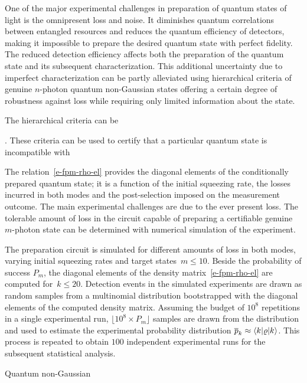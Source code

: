 \documentclass{article}
\begin{document}
One of the major experimental challenges in preparation of quantum states of light is the omnipresent loss and noise. It diminishes quantum correlations between entangled resources and reduces the quantum efficiency of detectors, making it impossible to prepare the desired quantum state with perfect fidelity. The reduced detection efficiency affects both the preparation of the quantum state and its subsequent characterization. This additional uncertainty due to imperfect characterization can be partly alleviated using hierarchical criteria of genuine $n$-photon quantum non-Gaussian states \cite{lachman2019} offering a certain degree of robustness against loss while requiring only limited information about the state.

The hierarchical criteria \cite{lachman2019} can be 

. These criteria can be used to certify that a particular quantum state is incompatible with 



The relation~\eqref{e-fpm-rho-el} provides the diagonal elements of the conditionally prepared quantum state; it is a function of the initial squeezing rate, the losses incurred in both modes and the post-selection imposed on the measurement outcome. The main experimental challenges are due to the ever present loss. The tolerable amount of loss in the circuit capable of preparing a certifiable genuine $m$-photon state can be determined with numerical simulation of the experiment. 





The preparation circuit is simulated for different amounts of loss in both modes, varying initial squeezing rates and target states~${m \leq 10}$. Beside the probability of success $P_{m}$, the diagonal elements of the density matrix~\eqref{e-fpm-rho-el} are computed for~${k \leq 20}$. Detection events in the simulated experiments are drawn as random samples from a multinomial distribution bootstrapped with the diagonal elements of the computed density matrix. Assuming the budget of $10^{8}$ repetitions in a single experimental run, ${\lfloor 10^{8} \times P_{m} \rfloor}$ samples are drawn from the distribution and used to estimate the experimental probability distribution ${\overline{p}_{k} \approx \braket{k|\varrho|k}}$. This process is repeated to obtain $100$ independent experimental runs for the subsequent statistical analysis.


Quantum non-Gaussian 
\end{document}
